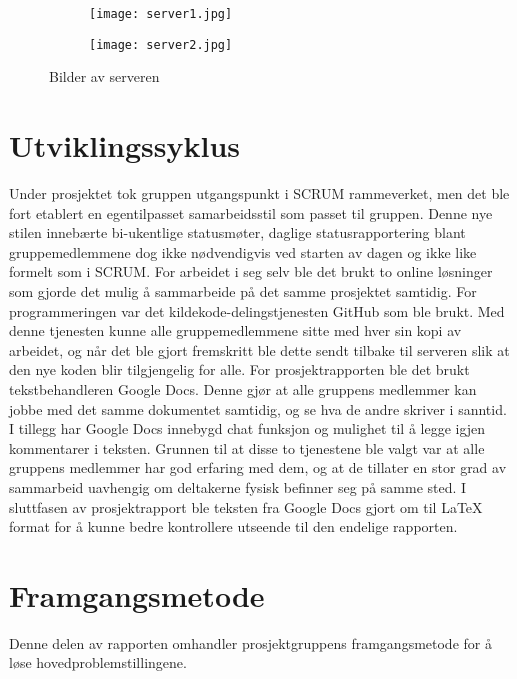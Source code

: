 \documentclass[../main.tex]{subfiles}
\begin{document}
\begin{figure}[h!]
        \centering
        \begin{subfigure}[b]{7cm}
                \centering
                \texttt{[image: server1.jpg]}

        \end{subfigure}
        \begin{subfigure}[b]{7cm}
                \centering
                \texttt{[image: server2.jpg]}

        \end{subfigure}
        \caption{Bilder av serveren}
\end{figure}

\section{Utviklingssyklus}
Under prosjektet tok gruppen utgangspunkt i SCRUM rammeverket, men det ble fort etablert en egentilpasset samarbeidsstil som passet til gruppen. Denne nye stilen innebærte bi-ukentlige statusmøter, daglige statusrapportering blant gruppemedlemmene dog ikke nødvendigvis ved starten av dagen og ikke like formelt som i SCRUM.\newline
\newline
For arbeidet i seg selv ble det brukt to online løsninger som gjorde det mulig å sammarbeide på det samme prosjektet samtidig. For programmeringen var det kildekode-delingstjenesten GitHub som ble brukt. Med denne tjenesten kunne alle gruppemedlemmene sitte med hver sin kopi av arbeidet, og når det ble gjort fremskritt ble dette sendt tilbake til serveren slik at den nye koden blir tilgjengelig for alle. \newline
For prosjektrapporten ble det brukt tekstbehandleren Google Docs. Denne gjør at alle gruppens medlemmer kan jobbe med det samme dokumentet samtidig, og se hva de andre skriver i sanntid. I tillegg har Google Docs innebygd chat funksjon og mulighet til å legge igjen kommentarer i teksten. Grunnen til at disse to tjenestene ble valgt var at alle gruppens medlemmer har god erfaring med dem, og at de tillater en stor grad av sammarbeid uavhengig om deltakerne fysisk befinner seg på samme sted. I sluttfasen av prosjektrapport ble teksten fra Google Docs gjort om til LaTeX format for å kunne bedre kontrollere utseende til den endelige rapporten.

\section{Framgangsmetode}
Denne delen av rapporten omhandler prosjektgruppens framgangsmetode for å løse hovedproblemstillingene.
\end{document}
